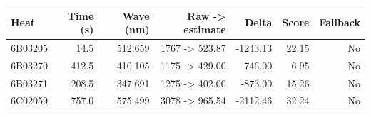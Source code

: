 \begingroup
{}
\begin{tabular}{lrrrrrr}
\toprule
Heat & Time (s) & Wave (nm) & Raw -> estimate & Delta & Score & Fallback \\
\midrule
6B03205 & 14.5 & 512.659 & 1767 -> 523.87 & -1243.13 & 22.15 & No \\
6B03270 & 412.5 & 410.105 & 1175 -> 429.00 & -746.00 & 6.95 & No \\
6B03271 & 208.5 & 347.691 & 1275 -> 402.00 & -873.00 & 15.26 & No \\
6C02059 & 757.0 & 575.499 & 3078 -> 965.54 & -2112.46 & 32.24 & No \\
\bottomrule
\end{tabular}
\endgroup
